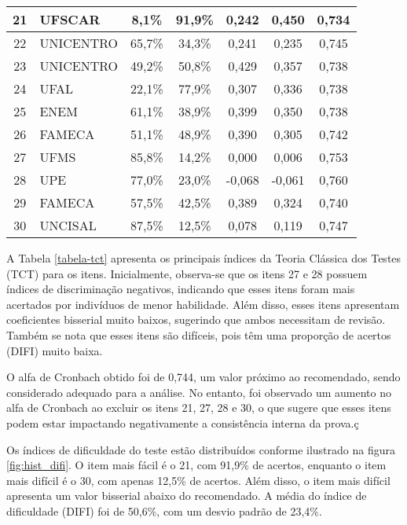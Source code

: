 \begin{table}[H]
{\begin{tabular*}{.8\textwidth}{@{\extracolsep{\fill}}clccccc@{}}
			\midrule
			21 & UFSCAR & 8,1\% & 91,9\% & 0,242 & 0,450 & 0,734 \\ 
			\midrule
			22 & UNICENTRO & 65,7\% & 34,3\% & 0,241 & 0,235 & 0,745 \\ 
			\midrule
			23 & UNICENTRO & 49,2\% & 50,8\% & 0,429 & 0,357 & 0,738 \\ 
			\midrule
			24 & UFAL & 22,1\% & 77,9\% & 0,307 & 0,336 & 0,738 \\ 
			\midrule
			25 & ENEM & 61,1\% & 38,9\% & 0,399 & 0,350 & 0,738 \\ 
			\midrule
			26 & FAMECA & 51,1\% & 48,9\% & 0,390 & 0,305 & 0,742 \\ 
			\midrule
			27 & UFMS & 85,8\% & 14,2\% & 0,000 & 0,006 & 0,753 \\ 
			\midrule
			28 & UPE & 77,0\% & 23,0\% & -0,068 & -0,061 & 0,760 \\ 
			\midrule
			29 & FAMECA & 57,5\% & 42,5\% & 0,389 & 0,324 & 0,740 \\ 
			\midrule
			30 & UNCISAL & 87,5\% & 12,5\% & 0,078 & 0,119 & 0,747 \\ 
			\bottomrule
		\end{tabular*}
	}{%
	}
\end{table}


A Tabela \ref{tabela-tct} apresenta os principais índices da Teoria Clássica dos Testes (TCT) para os itens. Inicialmente, observa-se que os itens 27 e 28 possuem índices de discriminação negativos, indicando que esses itens foram mais acertados por indivíduos de menor habilidade. Além disso, esses itens apresentam coeficientes bisserial muito baixos, sugerindo que ambos necessitam de revisão. Também se nota que esses itens são difíceis, pois têm uma proporção de acertos (DIFI) muito baixa.


O alfa de Cronbach obtido foi de 0,744, um valor próximo ao recomendado, sendo considerado adequado para a análise. No entanto, foi observado um aumento no alfa de Cronbach ao excluir os itens 21, 27, 28 e 30, o que sugere que esses itens podem estar impactando negativamente a consistência interna da prova.ç


Os índices de dificuldade do teste estão distribuídos conforme ilustrado na figura \ref{fig:hist_difi}. O item mais fácil é o 21, com 91,9\% de acertos, enquanto o item mais difícil é o 30, com apenas 12,5\% de acertos. Além disso, o item mais difícil apresenta um valor bisserial abaixo do recomendado. A média do índice de dificuldade (DIFI) foi de 50,6\%, com um desvio padrão de 23,4\%.

